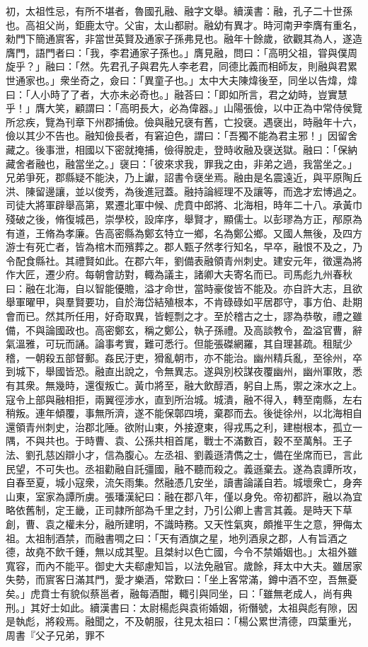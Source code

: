 \begin{pinyinscope}
初，太祖性忌，有所不堪者，魯國孔融、融字文舉。續漢書：融，孔子二十世孫也。高祖父尚，鉅鹿太守。父宙，太山都尉。融幼有異才。時河南尹李膺有重名，勑門下簡通賔客，非當世英賢及通家子孫弗見也。融年十餘歲，欲觀其為人，遂造膺門，語門者曰：「我，李君通家子孫也。」膺見融，問曰：「高明父祖，甞與僕周旋乎？」融曰：「然。先君孔子與君先人李老君，同德比義而相師友，則融與君累世通家也。」衆坐奇之，僉曰：「異童子也。」太中大夫陳煒後至，同坐以告煒，煒曰：「人小時了了者，大亦未必奇也。」融荅曰：「即如所言，君之幼時，豈實慧乎！」膺大笑，顧謂曰：「高明長大，必為偉器。」山陽張儉，以中正為中常侍侯覽所忿疾，覽為刊章下州郡捕儉。儉與融兄襃有舊，亡投襃。遇襃出，時融年十六，儉以其少不告也。融知儉長者，有窘迫色，謂曰：「吾獨不能為君主邪！」因留舍藏之。後事泄，相國以下密就掩捕，儉得脫走，登時收融及襃送獄。融曰：「保納藏舍者融也，融當坐之。」襃曰：「彼來求我，罪我之由，非弟之過，我當坐之。」兄弟爭死，郡縣疑不能決，乃上讞，詔書令襃坐焉。融由是名震遠近，與平原陶丘洪、陳留邊讓，並以俊秀，為後進冠蓋。融持論經理不及讓等，而逸才宏博過之。司徒大將軍辟舉高第，累遷北軍中候、虎賁中郎將、北海相，時年二十八。承黃巾殘破之後，脩復城邑，崇學校，設庠序，舉賢才，顯儒士。以彭璆為方正，邴原為有道，王脩為孝廉。告高密縣為鄭玄特立一鄉，名為鄭公鄉。又國人無後，及四方游士有死亡者，皆為棺木而殯葬之。郡人甄子然孝行知名，早卒，融恨不及之，乃令配食縣社。其禮賢如此。在郡六年，劉備表融領青州刺史。建安元年，徵還為將作大匠，遷少府。每朝會訪對，輙為議主，諸卿大夫寄名而已。司馬彪九州春秋曰：融在北海，自以智能優贍，溢才命世，當時豪俊皆不能及。亦自許大志，且欲舉軍曜甲，與羣賢要功，自於海岱結殖根本，不肯碌碌如平居郡守，事方伯、赴期會而已。然其所任用，好奇取異，皆輕剽之才。至於稽古之士，謬為恭敬，禮之雖備，不與論國政也。高密鄭玄，稱之鄭公，執子孫禮。及高談教令，盈溢官曹，辭氣溫雅，可玩而誦。論事考實，難可悉行。但能張磔網羅，其自理甚疏。租賦少稽，一朝殺五部督郵。姦民汙吏，猾亂朝市，亦不能治。幽州精兵亂，至徐州，卒到城下，舉國皆恐。融直出說之，令無異志。遂與別校謀夜覆幽州，幽州軍敗，悉有其衆。無幾時，還復叛亡。黃巾將至，融大飲醇酒，躬自上馬，禦之淶水之上。寇令上部與融相拒，兩翼徑涉水，直到所治城。城潰，融不得入，轉至南縣，左右稍叛。連年傾覆，事無所濟，遂不能保鄣四境，棄郡而去。後徙徐州，以北海相自還領青州刺史，治郡北陲。欲附山東，外接遼東，得戎馬之利，建樹根本，孤立一隅，不與共也。于時曹、袁、公孫共相首尾，戰士不滿數百，穀不至萬斛。王子法、劉孔慈凶辯小才，信為腹心。左丞祖、劉義遜清儁之士，備在坐席而已，言此民望，不可失也。丞祖勸融自託彊國，融不聽而殺之。義遜棄去。遂為袁譚所攻，自春至夏，城小寇衆，流矢雨集。然融憑几安坐，讀書論議自若。城壞衆亡，身奔山東，室家為譚所虜。張璠漢紀曰：融在郡八年，僅以身免。帝初都許，融以為宜略依舊制，定王畿，正司隷所部為千里之封，乃引公卿上書言其義。是時天下草創，曹、袁之權未分，融所建明，不識時務。又天性氣爽，頗推平生之意，狎侮太祖。太祖制酒禁，而融書啁之曰：「天有酒旗之星，地列酒泉之郡，人有旨酒之德，故堯不飲千鍾，無以成其聖。且桀紂以色亡國，今令不禁婚姻也。」太祖外雖寬容，而內不能平。御史大夫郗慮知旨，以法免融官。歲餘，拜太中大夫。雖居家失勢，而賔客日滿其門，愛才樂酒，常歎曰：「坐上客常滿，鐏中酒不空，吾無憂矣。」虎賁士有貌似蔡邕者，融每酒酣，輙引與同坐，曰：「雖無老成人，尚有典刑。」其好士如此。續漢書曰：太尉楊彪與袁術婚姻，術僭號，太祖與彪有隙，因是執彪，將殺焉。融聞之，不及朝服，往見太祖曰：「楊公累世清德，四葉重光，周書『父子兄弟，罪不
\end{pinyinscope}
